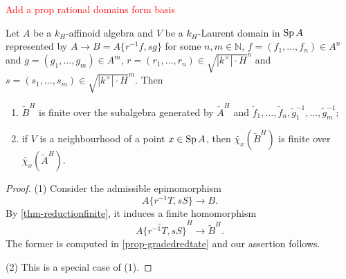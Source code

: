 \textcolor{red}{Add a prop rational domains form basis}


\begin{lemma}\label{lma-reductionfinitegraded}
    Let $A$ be a $k_H$-affinoid algebra and $V$ be a $k_H$-Laurent domain in $\operatorname{Sp} A$ represented by $A\rightarrow B=A\{r^{-1}f,sg\}$ for some $n,m\in \mathbb{N}$, $f=(f_1,\ldots,f_n)\in A^n$ and $g=(g_1,\ldots,g_m)\in A^m$, $r=(r_1,\ldots,r_n)\in \sqrt{|k^{\times}|\cdot H}^n$ and $s=(s_1,\ldots,s_m)\in \sqrt{|k^{\times}|\cdot H}^m$. Then
    \begin{enumerate}
        \item $\tilde{B}^H$ is finite over the subalgebra generated by $\tilde{A}^H$ and $\tilde{f}_1,\ldots,\tilde{f}_n,\tilde{g}_1^{-1},\ldots,\tilde{g}_m^{-1}$;
        \item if $V$ is a neighbourhood of a point $x\in \operatorname{Sp} A$, then $\tilde{\chi_x}(\tilde{B}^H)$ is finite over $\tilde{\chi_x}(\tilde{A}^H)$.
    \end{enumerate}
\end{lemma}
\begin{proof}
    (1) Consider the admissible epimomorphism 
    \[ 
        A\{r^{-1}T,s S\}\rightarrow B.
    \]
    By \cref{thm-reductionfinite}, it induces a finite homomorphism
    \[
        \widetilde{A\{r^{-1}T,s S\}}^H\rightarrow \tilde{B}^H.
    \]
    The former is computed in \cref{prop-gradedredtate} and our assertion follows.

    (2) This is a special case of (1).
\end{proof}

